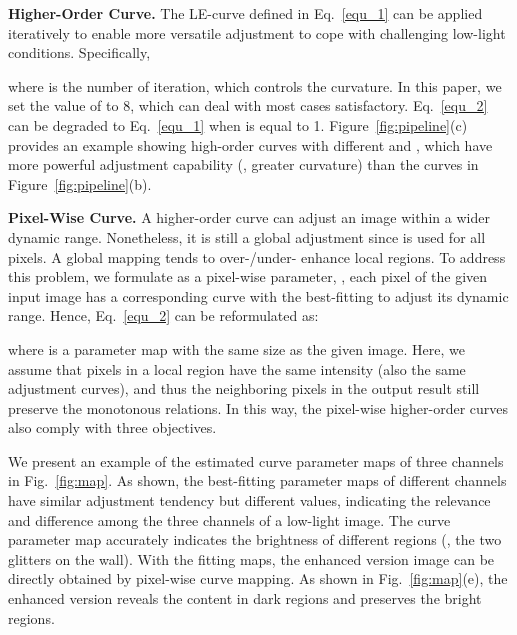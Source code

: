 \documentclass[10pt,twocolumn,letterpaper]{article}
\begin{document}
\noindent
\textbf{Higher-Order Curve.}
The LE-curve defined in Eq.~\eqref{equ_1} can be applied iteratively to enable more versatile adjustment to cope with challenging low-light conditions. Specifically,

where  is the number of iteration, which controls the curvature. In this paper, we set the value of  to 8, which can deal with most cases satisfactory. Eq.~\eqref{equ_2} can be degraded to Eq.~\eqref{equ_1} when  is equal to 1. Figure~\ref{fig:pipeline}(c) provides an example showing high-order curves with different  and , which have more powerful adjustment capability (\ie, greater curvature) than the curves in Figure~\ref{fig:pipeline}(b).





\noindent
\textbf{Pixel-Wise Curve.}
A higher-order curve can adjust an image within a wider dynamic range. Nonetheless, it is still a global adjustment since  is used for all pixels.
A global mapping tends to over-/under- enhance local regions.
To address this problem, we formulate  as a pixel-wise parameter, \ie, each pixel of the given input image has a corresponding curve with the best-fitting  to adjust its dynamic range.
Hence, Eq.~\eqref{equ_2} can be reformulated as:

where  is a parameter map with the same size as the given image.
Here, we assume that pixels in a local region have the same intensity (also the same adjustment curves), and thus the neighboring pixels in the output result still preserve the monotonous relations.
In this way, the pixel-wise higher-order curves also comply with three objectives.

We present an example of the estimated curve parameter maps of three channels in Fig.~\ref{fig:map}.
As shown, the best-fitting parameter maps of different channels have similar adjustment tendency but different values, indicating the relevance and difference among the three channels of a low-light image.
The curve parameter map accurately indicates the brightness of different regions (\eg, the two glitters on the wall).
With the fitting maps, the enhanced version image can be directly obtained by pixel-wise
curve mapping. As shown in Fig.~\ref{fig:map}(e), the enhanced version reveals the content in dark regions and preserves the bright regions.

\vspace{-5pt}
\end{document}
